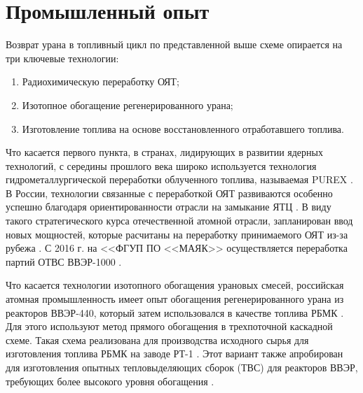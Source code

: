 \section{Промышленный опыт}\label{sec:ch1/sec1}

Возврат урана в топливный цикл по представленной выше схеме опирается на три ключевые технологии:
\begin{enumerate}
  \item Радиохимическую переработку ОЯТ;
  \item Изотопное обогащение регенерированного урана;
  \item Изготовление топлива на основе восстановленного отработавшего топлива.
\end{enumerate}

Что касается первого пункта, в странах, лидирующих в развитии ядерных технологий, с середины прошлого века широко используется технология гидрометаллургической переработки облученного топлива, называемая PUREX \cite{selvaduraySurveyNuclearFuel1979}. В России, технологии связанные с переработкой ОЯТ развиваются особенно успешно благодаря ориентированности отрасли на замыкание ЯТЦ \cite{balihinSostoyaniiPerspektivahRazvitiya2018, efimenkoProblemyPerspektivyRazvitiya2017}. В виду такого стратегического курса отечественной атомной отрасли, запланирован ввод новых мощностей, которые расчитаны на переработку принимаемого ОЯТ из-за рубежа \cite{050519L3942005}. С 2016 г. на <<ФГУП ПО <<МАЯК>> осуществляется переработка партий ОТВС ВВЭР-1000 \cite{PyatyyNacionalnyyDoklad}.

Что касается технологии изотопного обогащения урановых смесей, российская атомная промышленность имеет опыт обогащения регенерированного урана из реакторов ВВЭР-440, который затем использовался в качестве топлива РБМК \cite{VVER10001200Za}. Для этого используют метод прямого обогащения в трехпоточной каскадной схеме. Такая схема реализована для производства исходного сырья для изготовления топлива РБМК на заводе РТ-1 \cite{volkVozvratUranaIz2010}. Этот вариант также апробирован для изготовления опытных тепловыделяющих сборок (ТВС) для реакторов ВВЭР, требующих более высокого уровня обогащения \cite{proselkovAnalizVozmozhnostiIspolzovaniya2003}.

